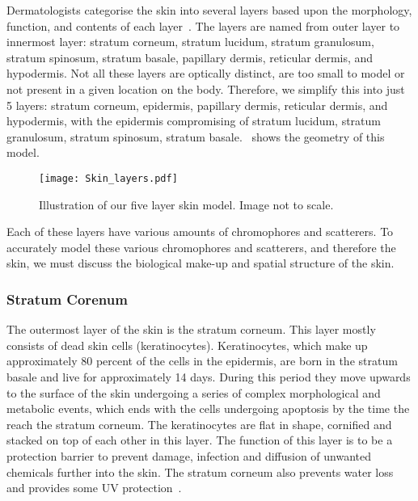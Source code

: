 Dermatologists categorise the skin into several layers based upon the morphology, function, and contents of each layer~\cite{freedberg1999fitzpatrick,zaidi2010dermatology}.
The layers are named from outer layer to innermost layer: stratum corneum, stratum lucidum, stratum granulosum, stratum spinosum, stratum basale, papillary dermis, reticular dermis, and hypodermis.
Not all these layers are optically distinct, are too small to model or not present in a given location on the body.
Therefore, we simplify this into just 5 layers: stratum corneum, epidermis, papillary dermis, reticular dermis, and hypodermis, with the epidermis compromising of stratum lucidum, stratum granulosum, stratum spinosum, stratum basale.~ shows the geometry of this model.

\begin{figure}[!htpb]
    \centering
    \texttt{[image: Skin\_layers.pdf]}
    \caption{Illustration of our five layer skin model. Image not to scale.}
    \label{fig:skinexample}
\end{figure}

Each of these layers have various amounts of chromophores and scatterers.
To accurately model these various chromophores and scatterers, and therefore the skin, we must discuss the biological make-up and spatial structure of the skin.

\subsubsection*{Stratum Corenum} %
\label{sub:stratum}

The outermost layer of the skin is the stratum corneum.
This layer mostly consists of dead skin cells (keratinocytes).
Keratinocytes, which make up approximately 80 percent of the cells in the epidermis, are born in the stratum basale and live for approximately 14 days.
During this period they move upwards to the surface of the skin undergoing a series of complex morphological and metabolic events, which ends with the cells undergoing apoptosis by the time the reach the stratum corneum.
The keratinocytes are flat in shape, cornified and stacked on top of each other in this layer.
The function of this layer is to be a protection barrier to prevent damage, infection and diffusion of unwanted chemicals further into the skin.
The stratum corneum also prevents water loss and provides some UV protection~\cite{freedberg1999fitzpatrick,zaidi2010dermatology}.



